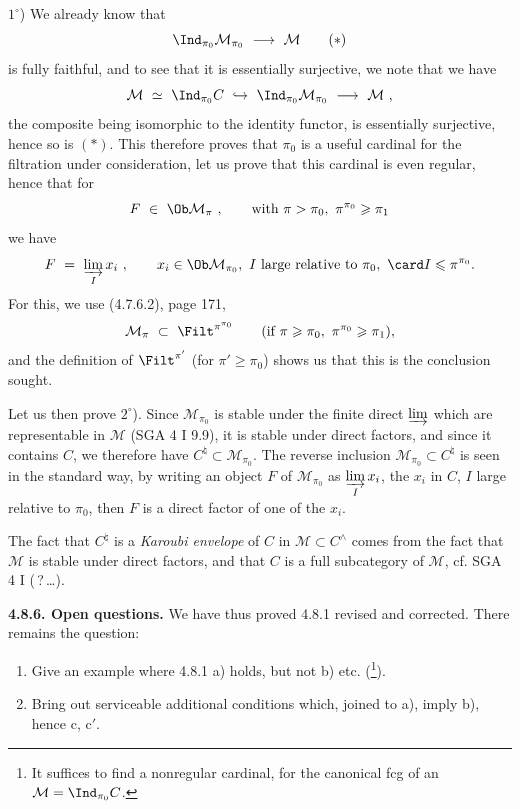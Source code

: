 $1^\circ$) We already know that
\[
\Ind_{\pi_0}\mathcal{M}_{\pi_0} \ \longrightarrow \ \mathcal{M} \tag*{$(*)$}
\]
is fully faithful, and to see that it is essentially surjective, we note that we have
\[
\mathcal{M} \ \simeq \ \Ind_{\pi_0}C \ \hookrightarrow \ \Ind_{\pi_0}\mathcal{M}_{\pi_0} \ \longrightarrow \ \mathcal{M} \ ,
\]
the composite being isomorphic to the identity functor, is essentially surjective, hence so is $(*)$. This therefore proves that $\pi_0$ is a useful cardinal for the filtration under consideration, let us prove that this cardinal is even regular, hence that for
\[
F \ \in \ \Ob\mathcal{M}_\pi \ , \qquad \text{with } \pi>\pi_0,\ \pi^{\pi_0}\geqslant\pi_1
\]
we have
\[
F \ = \ \varinjlim_I x_i \ , \qquad x_i\in\Ob\mathcal{M}_{\pi_0},\ I \text{ large relative to } \pi_0,\ \card I\leqslant\pi^{\pi_0}.
\]
For this, we use (4.7.6.2), page 171,
\[
\mathcal{M}_\pi \ \subset \ \Filt^{\pi^{\pi_0}} \qquad (\text{if } \pi\geqslant\pi_0,\ \pi^{\pi_0}\geqslant\pi_1),
\]
and the definition of $\Filt^{\pi'}$ (for $\pi'\geqslant\pi_0$) shows us that this is the conclusion sought.

Let us then prove $2^\circ$). Since $\mathcal{M}_{\pi_0}$ is stable under the finite direct $\varinjlim$ which are representable in $\mathcal{M}$ (SGA 4 I 9.9), it is stable under direct factors, and since it contains $C$, we therefore have $C^\natural\subset\mathcal{M}_{\pi_0}$. The reverse inclusion $\mathcal{M}_{\pi_0}\subset C^\natural$ is seen in the standard way, by writing an object $F$ of $\mathcal{M}_{\pi_0}$ as $\varinjlim\limits_I x_i$, the $x_i$ in $C$, $I$ large relative to $\pi_0$, then $F$ is a direct factor of one of the $x_i$.

The fact that $C^\natural$ is a \textit{Karoubi envelope} of $C$ in $\mathcal{M}\subset C^\wedge$ comes from the fact that $\mathcal{M}$ is stable under direct factors, and that $C$ is a full subcategory of $\mathcal{M}$, cf. SGA 4 I (\,?\,\dots).

\textbf{4.8.6. Open questions.} We have thus proved 4.8.1 revised and corrected. There remains the question:
\begin{enumerate}
\item[1)] Give an example where 4.8.1 a) holds, but not b) etc. (\footnote{It suffices to find a nonregular cardinal, for the canonical fcg of an $\mathcal{M}=\Ind_{\pi_0}C$.}).
\item[2)] Bring out serviceable additional conditions which, joined to a), imply b), hence c, c$'$.
\end{enumerate}

